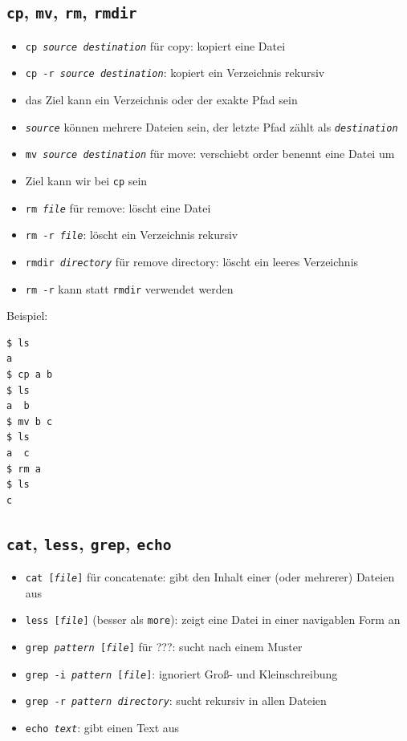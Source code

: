 \subsection{\texttt{cp}, \texttt{mv}, \texttt{rm}, \texttt{rmdir}}
\begin{itemize}
  \item \texttt{cp \textit{source} \textit{destination}} für copy: kopiert eine Datei
  \item \texttt{cp -r \textit{source} \textit{destination}}: kopiert ein Verzeichnis rekursiv
  \item das Ziel kann ein Verzeichnis oder der exakte Pfad sein
  \item \texttt{\textit{source}} können mehrere Dateien sein, der letzte Pfad zählt als \texttt{\textit{destination}}
  \item \texttt{mv \textit{source} \textit{destination}} für move: verschiebt order benennt eine Datei um
  \item Ziel kann wir bei \texttt{cp} sein
  \item \texttt{rm \textit{file}} für remove: löscht eine Datei
  \item \texttt{rm -r \textit{file}}: löscht ein Verzeichnis rekursiv
  \item \texttt{rmdir \textit{directory}} für remove directory: löscht ein leeres Verzeichnis
  \item \texttt{rm -r} kann statt \texttt{rmdir} verwendet werden
\end{itemize}
Beispiel:
\begin{verbatim}
$ ls
a
$ cp a b
$ ls
a  b
$ mv b c
$ ls
a  c
$ rm a
$ ls
c
\end{verbatim}

\subsection{\texttt{cat}, \texttt{less}, \texttt{grep}, \texttt{echo}}
\begin{itemize}
  \item \texttt{cat [\textit{file}]} für concatenate: gibt den Inhalt einer (oder mehrerer) Dateien aus
  \item \texttt{less [\textit{file}]} (besser als \texttt{more}): zeigt eine Datei in einer navigablen Form an
  \item \texttt{grep \textit{pattern} [\textit{file}]} für ???: sucht nach einem Muster
  \item \texttt{grep -i \textit{pattern} [\textit{file}]}: ignoriert Groß- und Kleinschreibung
  \item \texttt{grep -r \textit{pattern} \textit{directory}}: sucht rekursiv in allen Dateien
  \item \texttt{echo \textit{text}}: gibt einen Text aus
\end{itemize}

